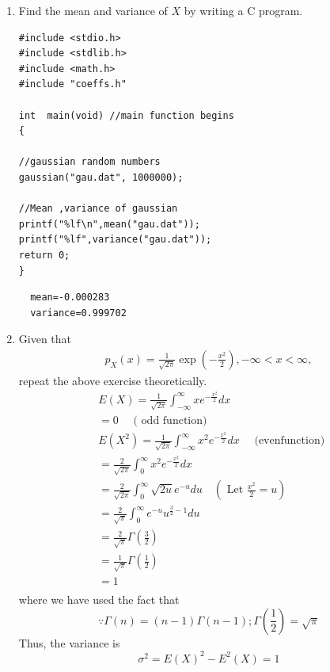 \documentclass[10pt, a4paper]{article}
\providecommand{\brak}[1]{\ensuremath{\left(#1\right)}}
\begin{document}
\begin{enumerate}
 \item Find the mean and variance of $X$ by writing a C program.
\begin{lstlisting}
#include <stdio.h>
#include <stdlib.h>
#include <math.h>
#include "coeffs.h"

int  main(void) //main function begins
{
 
//gaussian random numbers
gaussian("gau.dat", 1000000);

//Mean ,variance of gaussian
printf("%lf\n",mean("gau.dat"));
printf("%lf",variance("gau.dat"));
return 0;
}
\end{lstlisting}
\begin{lstlisting}
  mean=-0.000283
  variance=0.999702
\end{lstlisting}

\begin{center}
\end{center}

\item Given that 
\begin{align}
p_{X}(x) = \frac{1}{\sqrt{2\pi}}\exp\brak{-\frac{x^2}{2}}, -\infty < x < \infty,
\end{align}
repeat the above exercise theoretically.
$$
\begin{aligned}
& E(X)=\frac{1}{\sqrt{2 \pi}} \int_{-\infty}^{\infty} x e^{-\frac{x^2}{2}} d x \\
& =0 \quad \text { ( odd function) } \\
& E\left(X^2\right)=\frac{1}{\sqrt{2 \pi}} \int_{-\infty}^{\infty} x^2 e^{-\frac{x^2}{2}} d x \quad \text { (evenfunction) } \\
& =\frac{2}{\sqrt{2 \pi}} \int_0^{\infty} x^2 e^{-\frac{x^2}{2}} d x \\
& =\frac{2}{\sqrt{2 \pi}} \int_0^{\infty} \sqrt{2 u} e^{-u} d u \quad\left(\text { Let } \frac{x^2}{2}=u\right) \\
& =\frac{2}{\sqrt{\pi}} \int_0^{\infty} e^{-u} u^{\frac{3}{2}-1} d u \\
& =\frac{2}{\sqrt{\pi}} \Gamma\left(\frac{3}{2}\right) \\
& =\frac{1}{\sqrt{\pi}} \Gamma\left(\frac{1}{2}\right) \\
& =1 \\
&
\end{aligned}
$$
where we have used the fact that
$$
\because \Gamma(n)=(n-1) \Gamma(n-1) ; \Gamma\left(\frac{1}{2}\right)=\sqrt{\pi}
$$
Thus, the variance is
$$
\sigma^2=E(X)^2-E^2(X)=1
$$
\end{enumerate}
\end{document}
